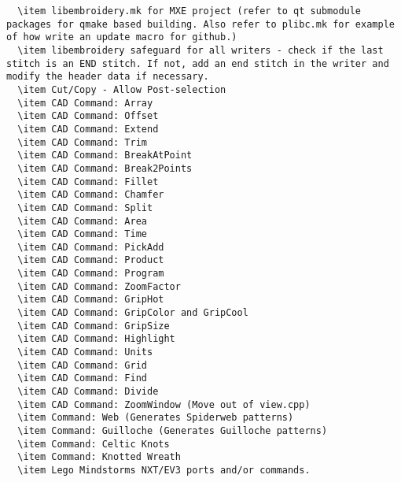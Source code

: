 \begin{verbatim}
  \item libembroidery.mk for MXE project (refer to qt submodule packages for qmake based building. Also refer to plibc.mk for example of how write an update macro for github.)
  \item libembroidery safeguard for all writers - check if the last stitch is an END stitch. If not, add an end stitch in the writer and modify the header data if necessary.
  \item Cut/Copy - Allow Post-selection
  \item CAD Command: Array
  \item CAD Command: Offset
  \item CAD Command: Extend
  \item CAD Command: Trim
  \item CAD Command: BreakAtPoint
  \item CAD Command: Break2Points
  \item CAD Command: Fillet
  \item CAD Command: Chamfer
  \item CAD Command: Split
  \item CAD Command: Area
  \item CAD Command: Time
  \item CAD Command: PickAdd
  \item CAD Command: Product
  \item CAD Command: Program
  \item CAD Command: ZoomFactor
  \item CAD Command: GripHot
  \item CAD Command: GripColor and GripCool
  \item CAD Command: GripSize
  \item CAD Command: Highlight
  \item CAD Command: Units
  \item CAD Command: Grid
  \item CAD Command: Find
  \item CAD Command: Divide
  \item CAD Command: ZoomWindow (Move out of view.cpp)
  \item Command: Web (Generates Spiderweb patterns)
  \item Command: Guilloche (Generates Guilloche patterns)
  \item Command: Celtic Knots
  \item Command: Knotted Wreath
  \item Lego Mindstorms NXT/EV3 ports and/or commands.

\end{verbatim}
